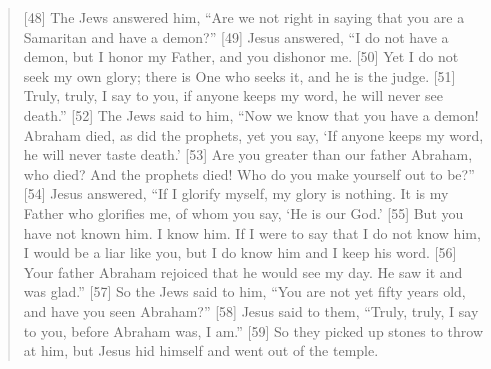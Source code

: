 \begin{quote}
  [48] The Jews answered him, “Are we not right in saying that you are a Samaritan and have a demon?” [49] Jesus answered, “I do not have a demon, but I honor my Father, and you dishonor me. [50] Yet I do not seek my own glory; there is One who seeks it, and he is the judge. [51] Truly, truly, I say to you, if anyone keeps my word, he will never see death.” [52] The Jews said to him, “Now we know that you have a demon! Abraham died, as did the prophets, yet you say, ‘If anyone keeps my word, he will never taste death.’ [53] Are you greater than our father Abraham, who died? And the prophets died! Who do you make yourself out to be?” [54] Jesus answered, “If I glorify myself, my glory is nothing. It is my Father who glorifies me, of whom you say, ‘He is our God.’ [55] But you have not known him. I know him. If I were to say that I do not know him, I would be a liar like you, but I do know him and I keep his word. [56] Your father Abraham rejoiced that he would see my day. He saw it and was glad.” [57] So the Jews said to him, “You are not yet fifty years old, and have you seen Abraham?” [58] Jesus said to them, “Truly, truly, I say to you, before Abraham was, I am.” [59] So they picked up stones to throw at him, but Jesus hid himself and went out of the temple.
  \end{quote}
